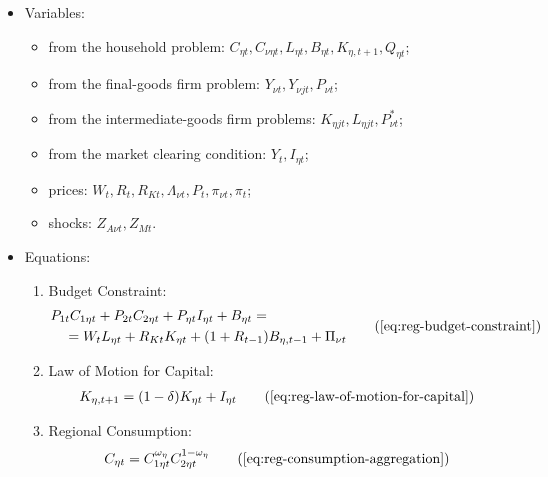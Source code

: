 \documentclass[
thesis.tex
]{subfiles}
\begin{document}
{\singlespacing
	
	\begin{itemize}

		\item Variables:
		
	\begin{itemize}
	
		\item from the household problem: $C_{\eta t}, C_{\nu \eta t}, L_{\eta t}, B_{\eta t}, K_{\eta, t+1}, Q_{\eta t}$;
	
		\item from the final-goods firm problem: $Y_{\nu t}, Y_{\nu jt}, P_{\nu t}$;
	
		\item from the intermediate-goods firm problems: $K_{\eta jt}, L_{\eta jt}, P_{\nu t}^\ast$;
	
		\item from the market clearing condition: $Y_t, I_{\eta t}$;
	
		\item prices: $W_t, R_t, R_{Kt}, \Lambda_{\nu t}, P_t, \pi_{\nu t}, \pi_t$;
	
		\item shocks: $Z_{A\nu t}, Z_{Mt}$.
	
	\end{itemize}

		\item Equations:
		
	\begin{enumerate}

		\item Budget Constraint:
		\begin{align}
		\begin{split}
			& P_{1t} C_{1\eta t} + P_{2t} C_{2\eta t} + P_{\eta t} I_{\eta t} + B_{\eta t} = \\ & \quad = W_t L_{\eta t} + R_{Kt} K_{\eta t} + (1 + R_{t-1}) B_{\eta,t-1} + \Pi_{\nu t}
		\end{split} \tag{\ref{eq:reg-budget-constraint}}
		\end{align}

		\item Law of Motion for Capital:
		\begin{align}
			K_{\eta, t+1} = (1-\delta)K_{\eta t} + I_{\eta t} \tag{\ref{eq:reg-law-of-motion-for-capital}}
		\end{align}

		\item Regional Consumption:
		\begin{align}
			C_{\eta t} = C_{1\eta t}^{\omega_{\eta}} C_{2\eta t}^{1-\omega_{\eta}} \tag{\ref{eq:reg-consumption-aggregation}}
		\end{align}


\end{enumerate}
\end{itemize}}
\end{document}
